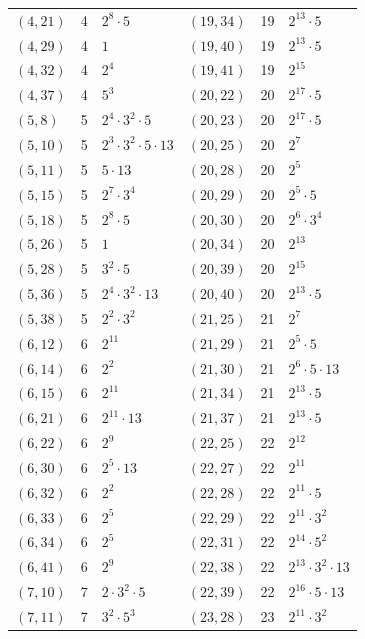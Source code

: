 \documentclass[11pt]{article}
\begin{document}
\begin{longtable}{@{}lrl@{\qquad}lrl@{}}
$(4,21)$ & 4 & $2^{8}\cdot 5$ & $(19,34)$ & 19 & $2^{13}\cdot 5$\\
$(4,29)$ & 4 & $1$ & $(19,40)$ & 19 & $2^{13}\cdot 5$\\
$(4,32)$ & 4 & $2^{4}$ & $(19,41)$ & 19 & $2^{15}$\\
$(4,37)$ & 4 & $5^{3}$ & $(20,22)$ & 20 & $2^{17}\cdot 5$\\
$(5,8)$ & 5 & $2^{4}\cdot 3^{2}\cdot 5$ & $(20,23)$ & 20 & $2^{17}\cdot 5$\\
$(5,10)$ & 5 & $2^{3}\cdot 3^{2}\cdot 5\cdot 13$ & $(20,25)$ & 20 & $2^{7}$\\
$(5,11)$ & 5 & $5\cdot 13$ & $(20,28)$ & 20 & $2^{5}$\\
$(5,15)$ & 5 & $2^{7}\cdot 3^{4}$ & $(20,29)$ & 20 & $2^{5}\cdot 5$\\
$(5,18)$ & 5 & $2^{8}\cdot 5$ & $(20,30)$ & 20 & $2^{6}\cdot 3^{4}$\\
$(5,26)$ & 5 & $1$ & $(20,34)$ & 20 & $2^{13}$\\
$(5,28)$ & 5 & $3^{2}\cdot 5$ & $(20,39)$ & 20 & $2^{15}$\\
$(5,36)$ & 5 & $2^{4}\cdot 3^{2}\cdot 13$ & $(20,40)$ & 20 & $2^{13}\cdot 5$\\
$(5,38)$ & 5 & $2^{2}\cdot 3^{2}$ & $(21,25)$ & 21 & $2^{7}$\\
$(6,12)$ & 6 & $2^{11}$ & $(21,29)$ & 21 & $2^{5}\cdot 5$\\
$(6,14)$ & 6 & $2^{2}$ & $(21,30)$ & 21 & $2^{6}\cdot 5\cdot 13$\\
$(6,15)$ & 6 & $2^{11}$ & $(21,34)$ & 21 & $2^{13}\cdot 5$\\
$(6,21)$ & 6 & $2^{11}\cdot 13$ & $(21,37)$ & 21 & $2^{13}\cdot 5$\\
$(6,22)$ & 6 & $2^{9}$ & $(22,25)$ & 22 & $2^{12}$\\
$(6,30)$ & 6 & $2^{5}\cdot 13$ & $(22,27)$ & 22 & $2^{11}$\\
$(6,32)$ & 6 & $2^{2}$ & $(22,28)$ & 22 & $2^{11}\cdot 5$\\
$(6,33)$ & 6 & $2^{5}$ & $(22,29)$ & 22 & $2^{11}\cdot 3^{2}$\\
$(6,34)$ & 6 & $2^{5}$ & $(22,31)$ & 22 & $2^{14}\cdot 5^{2}$\\
$(6,41)$ & 6 & $2^{9}$ & $(22,38)$ & 22 & $2^{13}\cdot 3^{2}\cdot 13$\\
$(7,10)$ & 7 & $2\cdot 3^{2}\cdot 5$ & $(22,39)$ & 22 & $2^{16}\cdot 5\cdot 13$\\
$(7,11)$ & 7 & $3^{2}\cdot 5^{3}$ & $(23,28)$ & 23 & $2^{11}\cdot 3^{2}$\\

\end{longtable}
\end{document}
